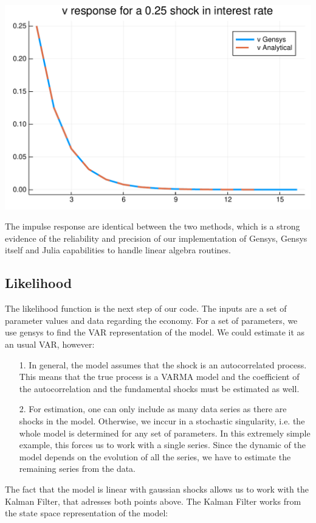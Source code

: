 \documentclass[12pt,a4paper]{article}
\begin{document}
\includegraphics[width=\linewidth]{figures/dsge_and_julia_14_1.pdf}

The impulse response are identical between the two methods, which is a strong evidence of the reliability and precision of our implementation of Gensys, Gensys itself and Julia capabilities to handle linear algebra routines.

\subsection{Likelihood}
The likelihood function is the next step of our code. The inputs are a set of parameter values and data regarding the economy. For a set of parameters, we use gensys to find the VAR representation of the model. We could estimate it as an usual VAR, however:

\begin{itemize}
\item[1. ] In general, the model assumes that the shock is an autocorrelated process. This means that the true process is a VARMA model and the coefficient of the autocorrelation and the fundamental shocks must be estimated as well.


\item[2. ] For estimation, one can only include as many data series as there are shocks in the model. Otherwise, we inccur in a stochastic singularity, i.e. the whole model is determined for any set of parameters. In this extremely simple example, this forces us to work with a single series. Since the dynamic of the model depends on the evolution of all the series, we have to estimate the remaining series from the data.

\end{itemize}
The fact that the model is linear with gaussian shocks allows us to work with the Kalman Filter, that adresses both points above. The Kalman Filter works from the state space representation of the model:
\end{document}
